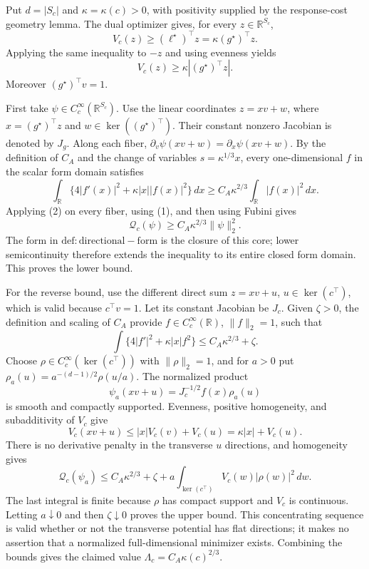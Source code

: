 Put \(d=|S_c|\) and \(\kappa=\kappa(c)>0\), with positivity supplied by the response-cost geometry lemma.  The dual optimizer gives, for every \(z\in\mathbb R^{S_c}\),
\[
V_c(z)\ge (\ell^\star)^\top z=\kappa(g^\star)^\top z.
\]
Applying the same inequality to \(-z\) and using evenness yields
\[
V_c(z)\ge\kappa|(g^\star)^\top z|. \tag{1}
\]
Moreover \((g^\star)^\top v=1\).

First take \(\psi\in C_c^\infty(\mathbb R^{S_c})\).  Use the linear coordinates
\(z=xv+w\), where \(x=(g^\star)^\top z\) and \(w\in\ker((g^\star)^\top)\).  Their constant nonzero Jacobian is denoted by \(J_g\).  Along each fiber, \(\partial_v\psi(xv+w)=\partial_x\psi(xv+w)\).  By the definition of \(C_A\) and the change of variables \(s=\kappa^{1/3}x\), every one-dimensional \(f\) in the scalar form domain satisfies
\[
\int_{\mathbb R}\{4|f'(x)|^2+\kappa|x||f(x)|^2\}\,dx
\ge C_A\kappa^{2/3}\int_{\mathbb R}|f(x)|^2\,dx. \tag{2}
\]
Applying (2) on every fiber, using (1), and then using Fubini gives
\[
\mathcal Q_c(\psi)
\ge C_A\kappa^{2/3}\|\psi\|_2^2.
\]
The form in \(\mathrm{def:directional-form}\) is the closure of this core; lower semicontinuity therefore extends the inequality to its entire closed form domain.  This proves the lower bound.

For the reverse bound, use the different direct sum
\(z=xv+u\), \(u\in\ker(c^\top)\), which is valid because \(c^\top v=1\).  Let its constant Jacobian be \(J_c\).  Given \(\zeta>0\), the definition and scaling of \(C_A\) provide \(f\in C_c^\infty(\mathbb R)\), \(\|f\|_2=1\), such that
\[
\int\{4|f'|^2+\kappa|x|f^2\}\le C_A\kappa^{2/3}+\zeta.
\]
Choose \(\rho\in C_c^\infty(\ker(c^\top))\) with \(\|\rho\|_2=1\), and for \(a>0\) put
\(\rho_a(u)=a^{-(d-1)/2}\rho(u/a)\).  The normalized product
\[
\psi_a(xv+u)=J_c^{-1/2}f(x)\rho_a(u)
\]
is smooth and compactly supported.  Evenness, positive homogeneity, and subadditivity of \(V_c\) give
\[
V_c(xv+u)\le |x|V_c(v)+V_c(u)=\kappa|x|+V_c(u).
\]
There is no derivative penalty in the transverse \(u\) directions, and homogeneity gives
\[
\mathcal Q_c(\psi_a)
\le C_A\kappa^{2/3}+\zeta
+a\int_{\ker(c^\top)}V_c(w)|\rho(w)|^2\,dw.
\]
The last integral is finite because \(\rho\) has compact support and \(V_c\) is continuous.  Letting \(a\downarrow0\) and then \(\zeta\downarrow0\) proves the upper bound.  This concentrating sequence is valid whether or not the transverse potential has flat directions; it makes no assertion that a normalized full-dimensional minimizer exists.  Combining the bounds gives the claimed value \(\Lambda_c=C_A\kappa(c)^{2/3}\).

